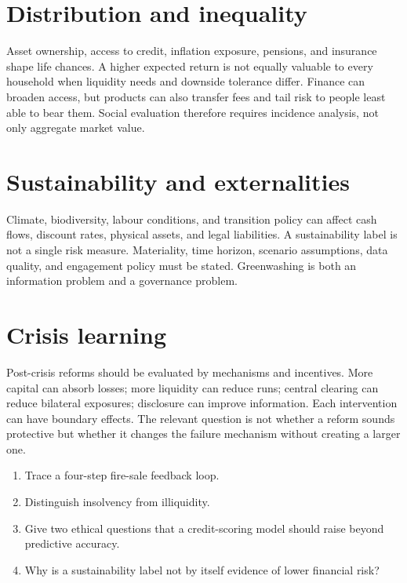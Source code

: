 \section{Distribution and inequality}
Asset ownership, access to credit, inflation exposure, pensions, and insurance shape life chances. A higher expected return is not equally valuable to every household when liquidity needs and downside tolerance differ. Finance can broaden access, but products can also transfer fees and tail risk to people least able to bear them. Social evaluation therefore requires incidence analysis, not only aggregate market value.

\section{Sustainability and externalities}
Climate, biodiversity, labour conditions, and transition policy can affect cash flows, discount rates, physical assets, and legal liabilities. A sustainability label is not a single risk measure. Materiality, time horizon, scenario assumptions, data quality, and engagement policy must be stated. Greenwashing is both an information problem and a governance problem.

\section{Crisis learning}
Post-crisis reforms should be evaluated by mechanisms and incentives. More capital can absorb losses; more liquidity can reduce runs; central clearing can reduce bilateral exposures; disclosure can improve information. Each intervention can have boundary effects. The relevant question is not whether a reform sounds protective but whether it changes the failure mechanism without creating a larger one.


\begin{exerciseblock}
\begin{enumerate}
  \item Trace a four-step fire-sale feedback loop.
  \item Distinguish insolvency from illiquidity.
  \item Give two ethical questions that a credit-scoring model should raise beyond predictive accuracy.
  \item Why is a sustainability label not by itself evidence of lower financial risk?
\end{enumerate}
\end{exerciseblock}

